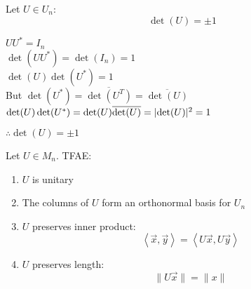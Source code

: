 \documentclass[letterpaper,12pt,fleqn]{article}
\newcommand{\inner}[2]{\left<#1,#2\right>}
\newcommand{\vx}{\vec{x}}
\newcommand{\vy}{\vec{y}}
\begin{document}
\begin{theorem}
  Let $U\in U_n$:
  \[\det(U)=\pm1\]
\end{theorem}

\begin{theproof}
  $UU^*=I_n$ \\
  $\det(UU^*)=\det(I_n)=1$ \\
  $\det(U)\det(U^*)=1$ \\
  But $\det(U^*)=\overline{\det(U^T)}=\overline{\det(U)}$ \\
  $\det(U)\det(U^*)=\det(U)\overline{\det(U)}=\lvert\det(U)\rvert^2=1$

  $\therefore\det(U)=\pm1$
\end{theproof}

\begin{theorem}
  Let $U\in M_n$. TFAE:
  \begin{enumerate}
  \item $U$ is unitary

  \item The columns of $U$ form an orthonormal basis for $U_n$

  \item $U$ preserves inner product:
    \[\inner{\vx}{\vy}=\inner{U\vx}{U\vy}\]
    
  \item $U$ preserves length:
    \[\|U\vx\|=\|x\|\]
  \end{enumerate}
\end{theorem}
\end{document}
